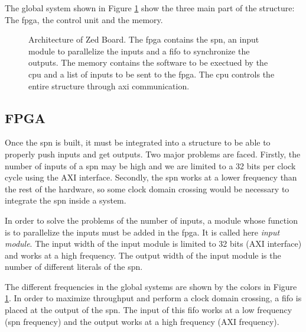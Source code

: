 The global system shown in Figure \ref{fig:glob_workflow} show the three main part of the structure: The \gls{fpga}, the control unit and the memory.

\begin{figure}[!ht]
\begin{mdframed}
	\centering
	
	\caption{Architecture of Zed Board. The \gls{fpga} contains the \gls{spn}, an input module to parallelize the inputs and a \gls{fifo} to synchronize the outputs. The memory contains the software to be exectued by the \gls{cpu} and a list of inputs to be sent to the \gls{fpga}. The \gls{cpu} controls the entire structure through \gls{axi} communication.}
	\label{fig:glob_workflow}
\end{mdframed}
\end{figure}

\subsection{FPGA}

Once the \gls{spn} is built, it must be integrated into a structure to be able to properly push inputs and get outputs. Two major problems are faced. Firstly, the number of inputs of a \gls{spn} may be high and we are limited to a 32 bits per clock cycle using the AXI interface. Secondly, the \gls{spn} works at a lower frequency than the rest of the hardware, so some clock domain crossing would be necessary to integrate the \gls{spn} inside a system.

In order to solve the problems of the number of inputs, a module whose function is to parallelize the inputs must be added in the \gls{fpga}. It is called here \textit{input module}. The input width of the input module is limited to 32 bits (AXI interface) and works at a high frequency. The output width of the input module is the number of different literals of the \gls{spn}.

The different frequencies in the global systems are shown by the colors in Figure \ref{fig:glob_workflow}. In order to maximize throughput and perform a clock domain crossing, a \gls{fifo} is placed at the output of the \gls{spn}. The input of this \gls{fifo} works at a low frequency (\gls{spn} frequency) and the output works at a high frequency (AXI frequency).

